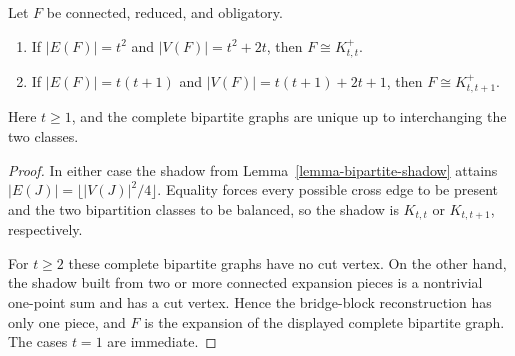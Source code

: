 \begin{corollary}
\label{corollary-balanced-endpoint-rigidity}
Let $F$ be connected, reduced, and obligatory.
\begin{enumerate}
\item If $|E(F)|=t^2$ and $|V(F)|=t^2+2t$, then
$F\cong K_{t,t}^+$.
\item If $|E(F)|=t(t+1)$ and $|V(F)|=t(t+1)+2t+1$, then
$F\cong K_{t,t+1}^+$.
\end{enumerate}
Here $t\ge1$, and the complete bipartite graphs are unique up to interchanging
the two classes.
\end{corollary}
\begin{proof}
In either case the shadow from Lemma~\ref{lemma-bipartite-shadow} attains
$|E(J)|=\lfloor|V(J)|^2/4\rfloor$.  Equality forces every possible cross edge
to be present and the two bipartition classes to be balanced, so the shadow is
$K_{t,t}$ or $K_{t,t+1}$, respectively.

For $t\ge2$ these complete bipartite graphs have no cut vertex.  On the other
hand, the shadow built from two or more connected expansion pieces is a
nontrivial one-point sum and has a cut vertex.  Hence the bridge-block
reconstruction has only one piece, and $F$ is the expansion of the displayed
complete bipartite graph.  The cases $t=1$ are immediate.
\end{proof}

